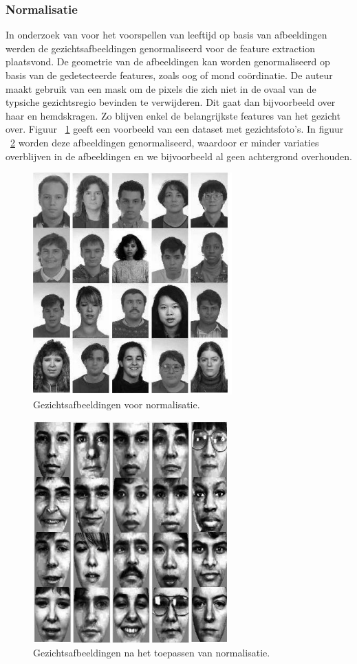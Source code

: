 \subsubsection{Normalisatie}
In onderzoek van \autocite{Chen2011} voor het voorspellen van leeftijd op basis van afbeeldingen werden de gezichtsafbeeldingen genormaliseerd voor de feature extraction plaatsvond. De geometrie van de afbeeldingen kan worden genormaliseerd op basis van de gedetecteerde features, zoals oog of mond coördinatie. De auteur maakt gebruik van een mask om de pixels die zich niet in de ovaal van de typsiche gezichtsregio bevinden te verwijderen. Dit gaat dan bijvoorbeeld over haar en hemdskragen. Zo blijven enkel de belangrijkste features van het gezicht over. Figuur {~\ref{fig:vbeforenormalisation}} geeft een voorbeeld van een dataset met gezichtsfoto's. In figuur {~\ref{fig:vafternormalisation}} worden deze afbeeldingen genormaliseerd, waardoor er minder variaties overblijven in de afbeeldingen en we bijvoorbeeld al geen achtergrond overhouden.
\begin{figure}
    \centering
    \includegraphics{graphics/beforenorm.PNG}
    \caption[Gezichtsafbeeldingen voor normalisatie]{\label{fig:vbeforenormalisation}Gezichtsafbeeldingen voor normalisatie\autocite{Chen2011}.}
\end{figure}
\begin{figure}
    \centering
    \includegraphics{graphics/afternorm.PNG}
    \caption[Gezichtsafbeeldingen na normalisatie]{\label{fig:vafternormalisation}Gezichtsafbeeldingen na het toepassen van normalisatie\autocite{Chen2011}.}
\end{figure}  


